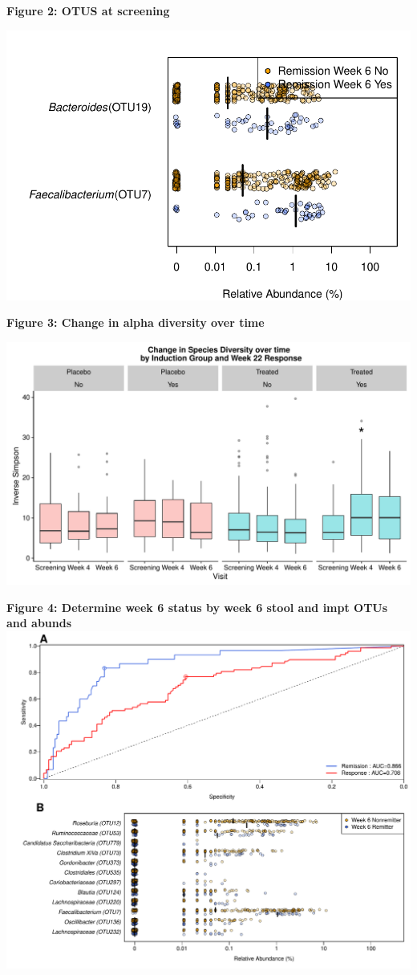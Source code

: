 \documentclass[11pt,]{article}
\begin{document}
\newpage

\textbf{Figure 2: OTUS at screening}

\includegraphics{figures/basesigOTUabund.REMISSwk6.pdf}

\newpage

\textbf{Figure 3: Change in alpha diversity over time}

\includegraphics{figures/wk046.adivXvisitXindtrtXrelRSPwk22.pdf}

\newpage

\textbf{Figure 4: Determine week 6 status by week 6 stool and impt OTUs
and abunds} \includegraphics{figures/Figure3.pdf}
\end{document}
